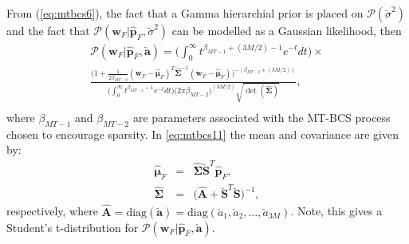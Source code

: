 \documentclass[10pt,final]{IEEEtran}
\begin{document}
From (\ref{eq:mtbcs6}), the fact that a Gamma hierarchial prior is placed on $\mathcal{P}(\breve{\sigma}^{2})$ and the fact that $\mathcal{P}(\textbf{w}_{F}|\hat{\textbf{p}}_{F},\breve{\sigma}^{2})$ can be modelled as a Gaussian likelihood, then
\small
\begin{eqnarray}\label{eq:mtbcs11} \nonumber
  \mathcal{P}(\textbf{w}_{F}|\hat{\textbf{p}}_{F},\breve{\textbf{a}}) = \bigg(\int_{0}^{\infty}t^{\beta_{MT-1}+(3M/2)-1}e^{-t}dt\bigg)\times\\ \nonumber
   \frac{\big(1+\frac{1}{2\beta_{MT-2}}(\textbf{w}_{F}-\hat{\boldsymbol\mu}_{F})^{T}\hat{\boldsymbol\Sigma}^{-1}(\textbf{w}_{F}-\hat{\boldsymbol\mu}_{F})\big)^{-(\beta_{MT-2}+(3M/2))}}{\big( \int_{0}^{\infty}t^{\beta_{MT-1}-1}e^{-t}dt \big)\big(2\pi\beta_{MT-2}\big)^{(3M/2)}\sqrt{\det(\hat{\boldsymbol\Sigma})}},\\
\end{eqnarray}
\normalsize
where $\beta_{MT-1}$ and $\beta_{MT-2}$ are parameters associated with the MT-BCS process chosen to encourage sparsity.  In \eqref{eq:mtbcs11} the mean and covariance are given by:
\begin{eqnarray}\label{eq:mtbcs12}
  \hat{\boldsymbol\mu}_{F}&=&\hat{\boldsymbol\Sigma}\breve{\textbf{S}}^{T}\hat{\textbf{p}}_{F}, \\ \label{eq:mtbcs13}
  \hat{\boldsymbol\Sigma}&=&\bigg(\hat{\textbf{A}}+\breve{\textbf{S}}^{T}\breve{\textbf{S}}\bigg)^{-1},
\end{eqnarray}
respectively, where $\hat{\textbf{A}}=\text{diag}(\breve{\textbf{a}})=\text{diag}(\breve{a}_{1}, \breve{a}_{2}, \ldots, \breve{a}_{3M})$.  Note, this gives a Student's t-distribution for $\mathcal{P}(\textbf{w}_{F}|\hat{\textbf{p}}_{F},\breve{\textbf{a}})$.
\end{document}
